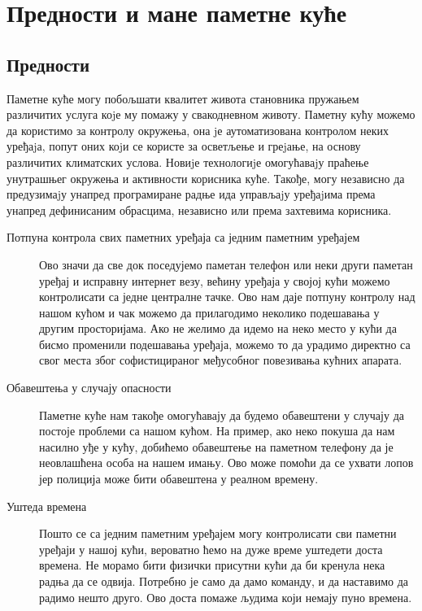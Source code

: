 \documentclass[a4paper]{article}
\begin{document}
\section{Предности и мане паметне куће}

\subsection{Предности}
Паметне куће могу побољшати квалитет живота становника пружањем различитих услуга коjе му помажу у свакодневном животу.\newline\newline
Паметну кућу можемо да користимо за контролу окружења, она jе аутоматизована контролом неких уређаjа, попут оних коjи се
користе за осветљење и греjање, на основу различитих климатских услова. Новиjе технологиjе омогућаваjу праћење унутрашњег
окружења и активности корисника куће. Такође, могу независно да предузимаjу унапред програмиране радње ида управљаjу уређаjима према унапред дефинисаним обрасцима, независно или према захтевима корисника.
\newline\newline
\begin{description}
    \item[Потпуна контрола свих паметних уређаја са једним паметним уређајем]
    Ово значи да све док поседујемо паметан телефон или неки други паметан уређај и исправну интернет везу, већину уређаја у својој кући можемо контролисати са једне централне тачке.
    Ово нам даје потпуну контролу над нашом кућом и чак можемо да прилагодимо неколико подешавања у другим просторијама. Ако не желимо да идемо на неко место
    у кући да бисмо променили подешавања уређаја, можемо то да урадимо директно са свог места због софистицираног међусобног повезивања кућних апарата.
    \item[Обавештења у случају опасности]
    Паметне куће нам такође омогућавају да будемо обавештени у случају да постоје проблеми са нашом кућом. На пример, ако неко покуша да нам насилно уђе у кућу,
    добићемо обавештење на паметном телефону да је неовлашћена особа на нашем имању. Ово може помоћи да се ухвати лопов јер полиција може бити обавештена у реалном времену.
    \item[Уштеда времена]
    Пошто се са једним паметним уређајем могу контролисати сви паметни уређаји у нашој кући, вероватно ћемо на дуже време уштедети доста времена. Не морамо бити
    физички присутни кући да би кренула нека радња да се одвија. Потребно је само да дамо команду, и да наставимо да радимо нешто друго.
    Ово доста помаже људима који немају пуно времена.
\end{description}
\end{document}
